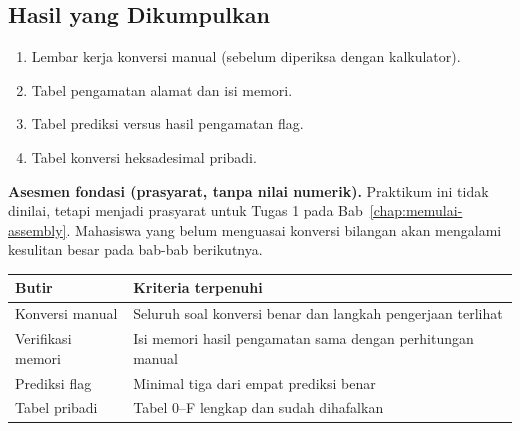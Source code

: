 \subsection{Hasil yang Dikumpulkan}

\begin{enumerate}
    \item Lembar kerja konversi manual (sebelum diperiksa dengan
          kalkulator).
    \item Tabel pengamatan alamat dan isi memori.
    \item Tabel prediksi versus hasil pengamatan flag.
    \item Tabel konversi heksadesimal pribadi.
\end{enumerate}

\begin{asesmenbox}
\textbf{Asesmen fondasi (prasyarat, tanpa nilai numerik).} Praktikum
ini tidak dinilai, tetapi menjadi prasyarat untuk Tugas 1 pada
Bab~\ref{chap:memulai-assembly}. Mahasiswa yang belum menguasai konversi
bilangan akan mengalami kesulitan besar pada bab-bab berikutnya.

\begin{tabular}{@{}p{7.0cm}p{6.4cm}@{}}
    \toprule
    \textbf{Butir} & \textbf{Kriteria terpenuhi} \\
    \midrule
    Konversi manual & Seluruh soal konversi benar dan langkah
    pengerjaan terlihat \\
    \addlinespace
    Verifikasi memori & Isi memori hasil pengamatan sama dengan
    perhitungan manual \\
    \addlinespace
    Prediksi flag & Minimal tiga dari empat prediksi benar \\
    \addlinespace
    Tabel pribadi & Tabel 0--F lengkap dan sudah dihafalkan \\
    \bottomrule
\end{tabular}
\end{asesmenbox}

